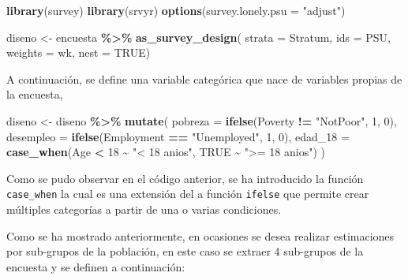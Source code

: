 \documentclass[
  spanish,
  12pt,
]{book}
\newenvironment{Shaded}{\begin{snugshade}}{\end{snugshade}}
\newcommand{\AttributeTok}[1]{\textcolor[rgb]{0.13,0.29,0.53}{#1}}
\newcommand{\ConstantTok}[1]{\textcolor[rgb]{0.56,0.35,0.01}{#1}}
\newcommand{\DecValTok}[1]{\textcolor[rgb]{0.00,0.00,0.81}{#1}}
\newcommand{\FunctionTok}[1]{\textcolor[rgb]{0.13,0.29,0.53}{\textbf{#1}}}
\newcommand{\NormalTok}[1]{#1}
\newcommand{\OtherTok}[1]{\textcolor[rgb]{0.56,0.35,0.01}{#1}}
\newcommand{\SpecialCharTok}[1]{\textcolor[rgb]{0.81,0.36,0.00}{\textbf{#1}}}
\newcommand{\StringTok}[1]{\textcolor[rgb]{0.31,0.60,0.02}{#1}}
\begin{document}
\begin{Shaded}
\begin{Highlighting}[]
\FunctionTok{library}\NormalTok{(survey)}
\FunctionTok{library}\NormalTok{(srvyr)}
\FunctionTok{options}\NormalTok{(}\AttributeTok{survey.lonely.psu =} \StringTok{"adjust"}\NormalTok{)}

\NormalTok{diseno }\OtherTok{\textless{}{-}}\NormalTok{ encuesta }\SpecialCharTok{\%\textgreater{}\%} 
          \FunctionTok{as\_survey\_design}\NormalTok{(}
                           \AttributeTok{strata =}\NormalTok{ Stratum,  }
                           \AttributeTok{ids =}\NormalTok{ PSU,         }
                           \AttributeTok{weights =}\NormalTok{ wk,      }
                           \AttributeTok{nest =} \ConstantTok{TRUE}\NormalTok{)}
\end{Highlighting}
\end{Shaded}

A continuación, se define una variable categórica que nace de variables propias de la encuesta,

\begin{Shaded}
\begin{Highlighting}[]
\NormalTok{diseno }\OtherTok{\textless{}{-}}\NormalTok{ diseno }\SpecialCharTok{\%\textgreater{}\%} \FunctionTok{mutate}\NormalTok{(}
                     \AttributeTok{pobreza =} \FunctionTok{ifelse}\NormalTok{(Poverty }\SpecialCharTok{!=} \StringTok{"NotPoor"}\NormalTok{, }\DecValTok{1}\NormalTok{, }\DecValTok{0}\NormalTok{),}
                     \AttributeTok{desempleo =} \FunctionTok{ifelse}\NormalTok{(Employment }\SpecialCharTok{==} \StringTok{"Unemployed"}\NormalTok{, }\DecValTok{1}\NormalTok{, }\DecValTok{0}\NormalTok{),}
                     \AttributeTok{edad\_18 =} \FunctionTok{case\_when}\NormalTok{(Age }\SpecialCharTok{\textless{}} \DecValTok{18} \SpecialCharTok{\textasciitilde{}} \StringTok{"\textless{} 18 anios"}\NormalTok{, }\ConstantTok{TRUE} \SpecialCharTok{\textasciitilde{}} \StringTok{"\textgreater{}= 18 anios"}\NormalTok{)}
\NormalTok{)}
\end{Highlighting}
\end{Shaded}

Como se pudo observar en el código anterior, se ha introducido la función \texttt{case\_when} la cual es una extensión del a función \texttt{ifelse} que permite crear múltiples categorías a partir de una o varias condiciones.

Como se ha mostrado anteriormente, en ocasiones se desea realizar estimaciones por sub-grupos de la población, en este caso se extraer 4 sub-grupos de la encuesta y se definen a continuación:
\end{document}
